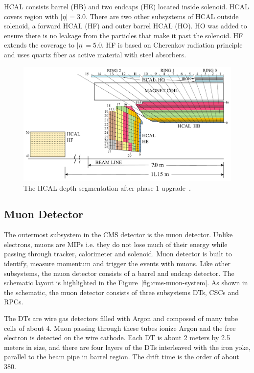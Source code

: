 \gls{HCAL} consists barrel (HB) and two endcaps (HE) located inside solenoid.
\gls{HCAL} covers region with \( |\eta| = 3.0 \).
There are two other subsystems of \gls{HCAL} outside solenoid,
a forward \gls{HCAL} (HF) and outer barrel \gls{HCAL} (HO).
HO was added to ensure there is no leakage from the particles that
make it past the solenoid. HF extends the coverage
to \(|\eta| = 5.0\). HF is based on Cherenkov radiation principle
and uses quartz fiber as active material with steel absorbers.

\begin{figure}[!ht]
  \centering
  \includegraphics[width=\textwidth]{figures/cms_hcal_depth_seg.pdf}
  \caption[The \gls{HCAL} depth segmentation after phase 1 upgrade]%
  {The \gls{HCAL} depth segmentation after phase 1 upgrade~\cite{image-cms-hcal-depth}.}%
  \label{fig:cms-hcal-depth}
\end{figure}

\subsection{
  Muon Detector
}

The outermost subsystem in the \gls{CMS} detector is the muon detector.
Unlike electrons, muons are \glspl{MIP} i.e.
they do not lose much of their energy
while passing through tracker, calorimeter and solenoid.
Muon detector is built to identify, measure momentum and trigger the events
with muons. Like other subsystems, the muon detector consists of a barrel and endcap
detector. The schematic layout is highlighted in the Figure~\ref{fig:cms-muon-system}.
As shown in the schematic, the muon detector consists of three subsystems \glspl{DT}, \glspl{CSC} and
\glspl{RPC}.

The \glspl{DT} are wire gas detectors filled with Argon and composed of
many tube cells of about 4\cm{}. Muon passing through these tubes
ionize Argon and the free electron is detected on the wire cathode.
Each DT is about 2 meters by 2.5 meters in size, and there are four layers
of the \glspl{DT} interleaved with the iron yoke, parallel to
the beam pipe in barrel region. The drift time is the order of about 380\nanoseconds.


